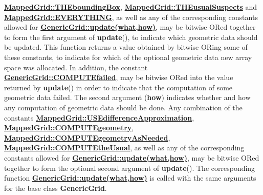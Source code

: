 \documentclass{article}
\begin{document}
    {\bf{}\hyperref{THEboundingBox}{THEboundingBox \rm(\S}{)}{MappedGrid::THEboundingBox}},
    {\bf{}\hyperref{THEusualSuspects}{THEusualSuspects \rm(\S}{)}{MappedGrid::THEusualSuspects}} and
    {\bf{}\hyperref{EVERYTHING}{EVERYTHING \rm(\S}{)}{MappedGrid::EVERYTHING}},
    as well as any of the corresponding constants allowed for
    {\bf{}\hyperref{GenericGrid::update(what,how)}{GenericGrid::update(what,how) \rm(\S}{)}{GenericGrid::update(what,how)}},
    may be bitwise ORed together to form the first argument of \textbf{update}(),
    to indicate which geometric data should be updated.
    This function returns a value obtained by bitwise ORing some of these constants,
    to indicate for which of the optional geometric data new array space was allocated.
    In addition, the constant
    {\bf{}\hyperref{COMPUTEfailed}{COMPUTEfailed \rm(\S}{)}{GenericGrid::COMPUTEfailed}},
    may be bitwise ORed into the value returned by \textbf{update}() in order to indicate
    that the computation of some geometric data failed.  The second argument (\textbf{how})
    indicates whether and how any computation of geometric data should be done.
    Any combination of the constants
    {\bf{}\hyperref{USEdifferenceApproximation}{USEdifferenceApproximation \rm(\S}{)}{MappedGrid::USEdifferenceApproximation}},
    {\bf{}\hyperref{COMPUTEgeometry}{COMPUTEgeometry \rm(\S}{)}{MappedGrid::COMPUTEgeometry}},
    {\bf{}\hyperref{COMPUTEgeometryAsNeeded}{COMPUTEgeometryAsNeeded \rm(\S}{)}{MappedGrid::COMPUTEgeometryAsNeeded}},
    {\bf{}\hyperref{COMPUTEtheUsual}{COMPUTEtheUsual \rm(\S}{)}{MappedGrid::COMPUTEtheUsual}},
    as well as any of the corresponding constants allowed for
    {\bf{}\hyperref{GenericGrid::update(what,how)}{GenericGrid::update(what,how) \rm(\S}{)}{GenericGrid::update(what,how)}},
    may be bitwise ORed together to form the optional second argument of \textbf{update}().
    The corresponding function
    {\bf{}\hyperref{update(what,how)}{update(what,how) \rm(\S}{)}{GenericGrid::update(what,how)}}
    is called with the same arguments for the base class \textbf{GenericGrid}.
\end{document}
